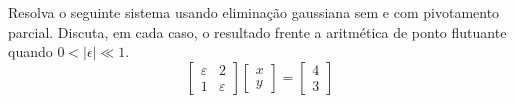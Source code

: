 \begin{ex} Resolva o seguinte sistema usando eliminação gaussiana sem e com pivotamento parcial. Discuta, em cada caso, o resultado frente a aritmética de ponto flutuante quando $0<|\epsilon| \ll 1$.
  \begin{equation}
    \begin{bmatrix}
      \varepsilon & 2\\
      1 & \varepsilon
    \end{bmatrix}
    \begin{bmatrix}
      x\\y
    \end{bmatrix}
    =
    \begin{bmatrix}
      4\\3
    \end{bmatrix}
  \end{equation}
\end{ex}
